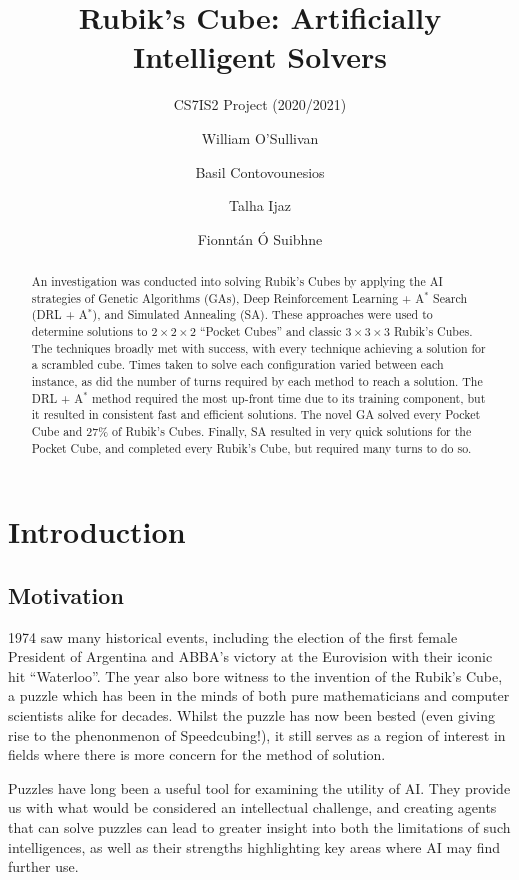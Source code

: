 \documentclass[UKenglish]{svproc}
\title{Rubik's Cube: Artificially Intelligent Solvers}
\subtitle{CS7IS2 Project (2020/2021)}
\author{
  William O'Sullivan   \and
  Basil Contovounesios \and
  Talha Ijaz           \and
  Fionnt\'an \'O Suibhne}
\institute{\email{
    wosulliv@tcd.ie,
    contovob@tcd.ie,
    ijazm@tcd.ie,
    suibhnef@tcd.ie}}
\begin{document}
\mainmatter
\maketitle              %

\begin{abstract}

  An investigation was conducted into solving Rubik's Cubes by applying the AI
  strategies of Genetic Algorithms (GAs), Deep Reinforcement Learning + A$^\ast$
  Search (DRL + A$^\ast$), and Simulated Annealing (SA). These approaches were
  used to determine solutions to $2\times 2\times 2$ ``Pocket Cubes'' and
  classic $3\times 3\times 3$ Rubik's Cubes. The techniques broadly met with
  success, with every technique achieving a solution for a scrambled cube. Times
  taken to solve each configuration varied between each instance, as did the
  number of turns required by each method to reach a solution. The DRL +
  A$^\ast$ method required the most up-front time due to its training component,
  but it resulted in consistent fast and efficient solutions. The novel GA
  solved every Pocket Cube and 27\% of Rubik's Cubes. Finally, SA resulted in
  very quick solutions for the Pocket Cube, and completed every Rubik's Cube,
  but required many turns to do so.


\end{abstract}

\section{Introduction}

\subsection{Motivation}
1974 saw many historical events, including the election of the first female President of Argentina and ABBA's victory at the Eurovision with their iconic hit ``Waterloo''. The year also bore witness to the invention of the Rubik's Cube, a puzzle which has been in the minds of both pure mathematicians and computer scientists alike for decades. Whilst the puzzle has now been bested (even giving rise to the phenonmenon of Speedcubing!), it still serves as a region of interest in fields where there is more concern for the method of solution.

Puzzles have long been a useful tool for examining the utility of AI. They provide us with what would be considered an intellectual challenge, and creating agents that can solve puzzles can lead to greater insight into both the limitations of such intelligences, as well as their strengths highlighting key areas where AI may find further use.
\end{document}
